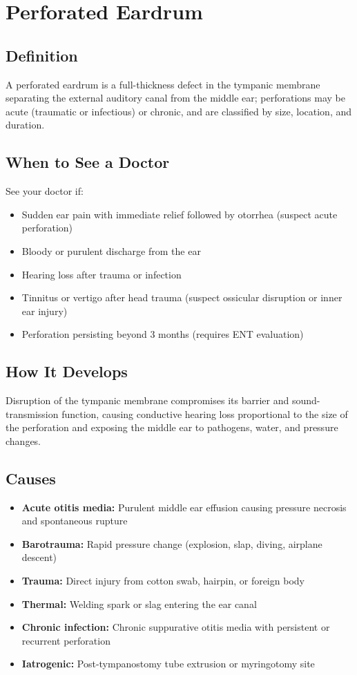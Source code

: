 \chapter{Perforated Eardrum}

\section*{Definition}
A perforated eardrum is a full-thickness defect in the tympanic membrane separating the external auditory canal from the middle ear; perforations may be acute (traumatic or infectious) or chronic, and are classified by size, location, and duration.

\section*{When to See a Doctor}
See your doctor if:
\begin{itemize}
  \item Sudden ear pain with immediate relief followed by otorrhea (suspect acute perforation)
  \item Bloody or purulent discharge from the ear
  \item Hearing loss after trauma or infection
  \item Tinnitus or vertigo after head trauma (suspect ossicular disruption or inner ear injury)
  \item Perforation persisting beyond 3 months (requires ENT evaluation)
\end{itemize}

\section*{How It Develops}
Disruption of the tympanic membrane compromises its barrier and sound-transmission function, causing conductive hearing loss proportional to the size of the perforation and exposing the middle ear to pathogens, water, and pressure changes.

\section*{Causes}
\begin{itemize}
  \item \textbf{Acute otitis media:} Purulent middle ear effusion causing pressure necrosis and spontaneous rupture
  \item \textbf{Barotrauma:} Rapid pressure change (explosion, slap, diving, airplane descent)
  \item \textbf{Trauma:} Direct injury from cotton swab, hairpin, or foreign body
  \item \textbf{Thermal:} Welding spark or slag entering the ear canal
  \item \textbf{Chronic infection:} Chronic suppurative otitis media with persistent or recurrent perforation
  \item \textbf{Iatrogenic:} Post-tympanostomy tube extrusion or myringotomy site
\end{itemize}


